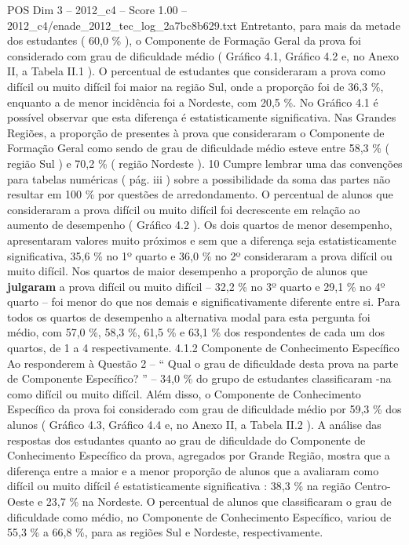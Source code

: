 \begin{textsample}{POS Dim 3 – 2012\_c4 – Score 1.00 – 2012\_c4/enade\_2012\_tec\_log\_2a7bc8b629.txt}
Entretanto, para mais da metade dos estudantes ( 60,0 \% ), o Componente de Formação Geral da prova foi considerado com grau de dificuldade médio ( Gráfico 4.1, Gráfico 4.2 e, no Anexo II, a Tabela II.1 ).
O percentual de estudantes que consideraram a prova como difícil ou muito difícil foi maior na região Sul, onde a proporção foi de 36,3 \%, enquanto a de menor incidência foi a Nordeste, com 20,5 \%.
No Gráfico 4.1 é possível observar que esta diferença é estatisticamente significativa.
Nas Grandes Regiões, a proporção de presentes à prova que consideraram o Componente de Formação Geral como sendo de grau de dificuldade médio esteve entre 58,3 \% ( região Sul ) e 70,2 \% ( região Nordeste ). 10 Cumpre lembrar uma das convenções para tabelas numéricas ( pág. iii ) sobre a possibilidade da soma das partes não resultar em 100 \% por questões de arredondamento.
O percentual de alunos que consideraram a prova difícil ou muito difícil foi decrescente em relação ao aumento de desempenho ( Gráfico 4.2 ).
Os dois quartos de menor desempenho, apresentaram valores muito próximos e sem que a diferença seja estatisticamente significativa, 35,6 \% no 1º quarto e 36,0 \% no 2º consideraram a prova difícil ou muito difícil.
Nos quartos de maior desempenho a proporção de alunos que \textbf{julgaram} a prova difícil ou muito difícil – 32,2 \% no 3º quarto e 29,1 \% no 4º quarto – foi menor do que nos demais e significativamente diferente entre si.
Para todos os quartos de desempenho a alternativa modal para esta pergunta foi médio, com 57,0 \%, 58,3 \%, 61,5 \% e 63,1 \% dos respondentes de cada um dos quartos, de 1 a 4 respectivamente. 4.1.2 Componente de Conhecimento Específico Ao responderem à Questão 2 – “ Qual o grau de dificuldade desta prova na parte de Componente Específico? ” – 34,0 \% do grupo de estudantes classificaram -na como difícil ou muito difícil.
Além disso, o Componente de Conhecimento Específico da prova foi considerado com grau de dificuldade médio por 59,3 \% dos alunos ( Gráfico 4.3, Gráfico 4.4 e, no Anexo II, a Tabela II.2 ).
A análise das respostas dos estudantes quanto ao grau de dificuldade do Componente de Conhecimento Específico da prova, agregados por Grande Região, mostra que a diferença entre a maior e a menor proporção de alunos que a avaliaram como difícil ou muito difícil é estatisticamente significativa : 38,3 \% na região Centro-Oeste e 23,7 \% na Nordeste.
O percentual de alunos que classificaram o grau de dificuldade como médio, no Componente de Conhecimento Específico, variou de 55,3 \% a 66,8 \%, para as regiões Sul e Nordeste, respectivamente.

\end{textsample}
